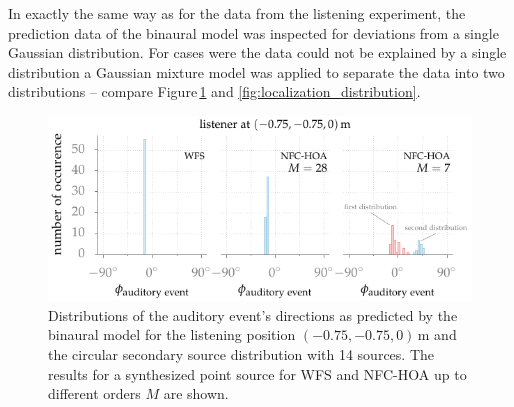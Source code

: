 In exactly the same way as for the data from the listening experiment, the
prediction data of the binaural model was inspected for deviations from a
single Gaussian distribution. For cases were the data could not be explained by
a single distribution a Gaussian mixture model was applied to separate the data
into two distributions -- compare
Figure\,\ref{fig:model_localization_distribution} and
\ref{fig:localization_distribution}.
%
\begin{figure}
    \includegraphics{fig6_02/fig6_02}
    \caption{Distributions of the auditory event's directions as predicted
    by the binaural model for the listening position $(-0.75,-0.75,0)$\,m and the
    circular secondary source distribution with 14 sources.
    The results for a synthesized point source for \ac{WFS} and
    \ac{NFC-HOA} up to different orders $M$ are shown.
    }
    \label{fig:model_localization_distribution}
\end{figure}


